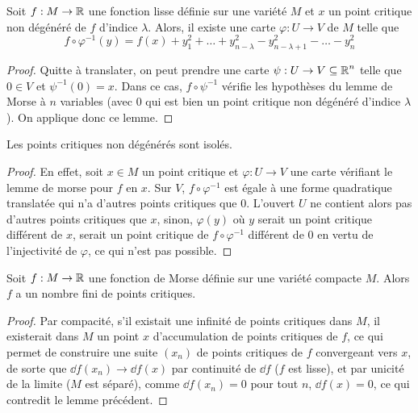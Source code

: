 \begin{lem}[de Morse]
    Soit $f:M\to \operatorname{\mathbb R}$ une fonction lisse définie sur une variété $M$ et $x$ un point critique 
    non dégénéré de $f$ d'indice $\lambda$. 
    Alors, il existe une carte $\varphi:U\to V$ de $M$ telle que 
    \[
        f\circ\varphi^{-1}(y)=f(x)+y_1^2+\dots+y_{n-\lambda}^2-y_{n-\lambda+1}^2-\dots-y_n^2
    \]
\end{lem}

\begin{proof}
    Quitte à translater, on peut prendre une carte $\psi:U\to V\subseteq \operatorname{\mathbb R}^n$ telle que 
    $0\in V$ et $\psi^{-1}(0)=x$.
    Dans ce cas, $f\circ\psi^{-1}$ vérifie les hypothèses du lemme de Morse à $n$ variables 
    (avec $0$ qui est bien un point critique non dégénéré d'indice $\lambda$). 
    On applique donc ce lemme.
\end{proof}

\begin{cor}
    Les points critiques non dégénérés sont isolés.
\end{cor}

\begin{proof}
    En effet, soit $x\in M$ un point critique et $\varphi:U\to V$ une carte vérifiant le 
    lemme de morse pour $f$ en $x$. 
    Sur $V$, $f\circ\varphi^{-1}$ est égale à une forme quadratique translatée qui n'a 
    d'autres points critiques que $0$. 
    L'ouvert $U$ ne contient alors pas d'autres points critiques que $x$, sinon, $\varphi(y)$ 
    où $y$ serait un point critique différent de $x$, serait un point critique de 
    $f\circ\varphi^{-1}$ différent de $0$ en vertu de l'injectivité de $\varphi$, ce qui n'est 
    pas possible.
\end{proof}

\begin{cor}
    Soit $f:M\to\operatorname{\mathbb R}$ une fonction de Morse définie sur une variété compacte $M$. 
    Alors $f$ a un nombre fini de points critiques.
\end{cor}

\begin{proof}
    Par compacité, s'il existait une infinité de points critiques dans $M$, il existerait dans 
    $M$ un point $x$ d'accumulation de points critiques de $f$, ce qui permet de construire 
    une suite $(x_n)$ de points critiques de $f$ convergeant vers $x$, de sorte que 
    $\dd f(x_n)\to \dd f(x)$ par continuité de $\dd f$ ($f$ est lisse), et par unicité de 
    la limite ($M$ est séparé), comme $\dd f(x_n)=0$ pour tout $n$, $\dd f(x) = 0$, ce qui 
    contredit le lemme précédent.
\end{proof}

